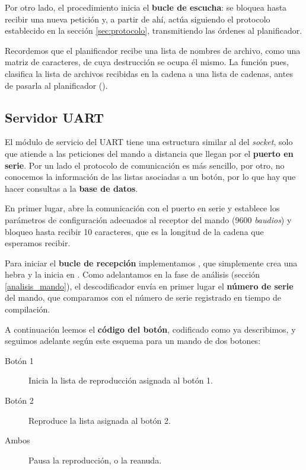 Por otro lado, el procedimiento  inicia el \textbf{bucle de escucha}: se bloquea hasta recibir una nueva petición y, a partir de ahí, actúa siguiendo el protocolo establecido en la sección \ref{sec:protocolo}, transmitiendo las órdenes al planificador.

Recordemos que el planificador recibe una lista de nombres de archivo, como una matriz de caracteres, de cuya destrucción se ocupa él mismo. La función  pues, clasifica la lista de archivos recibidas en la cadena a una lista de cadenas, antes de pasarla al planificador ().

\subsection{Servidor UART}

El módulo de servicio del \acrshort{UART} tiene una estructura similar al del \textit{socket}, solo que atiende a las peticiones del mando a distancia que llegan por el \textbf{puerto en serie}. Por un lado el protocolo de comunicación es más sencillo, por otro, no conocemos la información de las listas asociadas a un botón, por lo que hay que hacer consultas a la \textbf{base de datos}.

En primer lugar,  abre la comunicación con el puerto en serie y establece los parámetros de configuración adecuados al receptor del mando (9600 \textit{baudios}) y bloqueo hasta recibir 10 caracteres, que es la longitud de la cadena que esperamos recibir.

Para iniciar el \textbf{bucle de recepción} implementamos , que simplemente crea una hebra y la inicia en . Como adelantamos en la fase de análisis (sección \ref{analisis_mando}), el descodificador envía en primer lugar el \textbf{número de serie} del mando, que comparamos con el número de serie registrado en tiempo de compilación. 

A continuación leemos el \textbf{código del botón}, codificado como ya describimos, y seguimos adelante según este esquema para un mando de dos botones:

\begin{description}
	\item[Botón 1] Inicia la lista de reproducción asignada al botón 1.
	\item[Botón 2] Reproduce la lista asignada al botón 2.
	\item[Ambos] Pausa la reproducción, o la reanuda.
\end{description}

